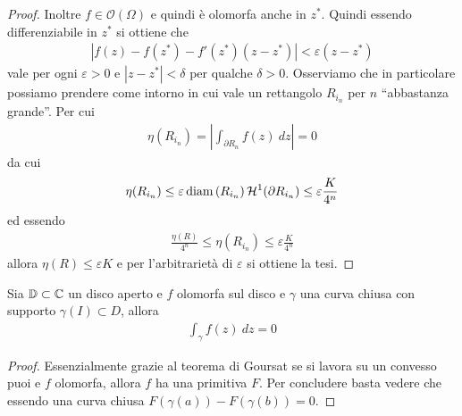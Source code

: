 \begin{proof}
	Inoltre $f \in \mathcal{O}(\Omega)$ e quindi è olomorfa anche in $z^*$. Quindi essendo differenziabile in $z^*$ si ottiene che 
	\begin{equation*}
	\begin{aligned}
	|f(z) - f(z^*) - f'(z^*)(z-z^*)| < \varepsilon(z - z^*)
	\end{aligned}
	\end{equation*}
	vale per ogni $\varepsilon > 0$ e $|z - z^*| < \delta$ per qualche $\delta > 0$. Osserviamo che in particolare possiamo prendere come intorno in cui vale un rettangolo $R_{i_n}$ per $n$ ``abbastanza grande''. Per cui
	\begin{equation*}
	\begin{aligned}
	\eta(R_{i_n}) = \left|\int_{\partial R_n} f(z)\ dz\right| = 0 %
	\end{aligned}
	\end{equation*}
	da cui 
	\begin{equation*}
	\begin{aligned}
	\eta(R_{i_n}) \le \varepsilon \operatorname{diam}\left(R_{i_n}\right) \mathcal{H}^1(\partial R_{i_n}) \le \varepsilon \frac{K}{4^n} 
	\end{aligned}
	\end{equation*}
	ed essendo
	\begin{equation*}
	\begin{aligned}
	\frac{\eta(R)}{4^n} \le \eta(R_{i_n}) \le \varepsilon \frac{K}{4^n}
	\end{aligned}
	\end{equation*}
	allora $\eta(R) \le \varepsilon K$ e per l'arbitrarietà di $\varepsilon$ si ottiene la tesi.
\end{proof}

\begin{theorem}
	\label{thr:cauchy-integrale}
	Sia $\mathbb{D} \subset \mathbb{C}$ un disco aperto e $f$ olomorfa sul disco e $\gamma$ una curva chiusa con supporto $\gamma(I) \subset D$, allora 
	\begin{equation*}
	\begin{aligned}
	\int_\gamma f(z)\ dz = 0
	\end{aligned}
	\end{equation*}
\end{theorem}
\begin{proof}
	Essenzialmente grazie al teorema di Goursat se si lavora su un convesso puoi e $f$ olomorfa, allora $f$ ha una primitiva $F$. Per concludere basta vedere che essendo una curva chiusa $F(\gamma(a)) - F(\gamma(b)) = 0$. 
\end{proof}

